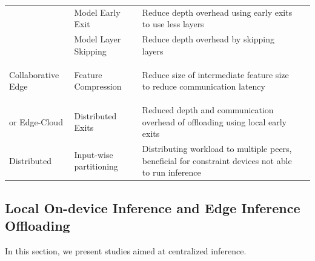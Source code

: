 \begin{minipage}[t]{\linewidth}
\begin{footnotesize}
\begin{longtabu}{>{\bfseries}X[c]|X[l]|X[3l]|X[c]}
			& Model Early Exit & Reduce depth overhead using early exits to use less layers%
			& \cite{leroux_resource-constrained_2015,teerapittayanon_branchynet:_2016, berestizshevsky_sacrificing_2019, kaya_shallow-deep_nodate, huang_multi-scale_2017} \tabularnewline
			& Model Layer Skipping & Reduce depth overhead by skipping layers %
			& \cite{wang_skipnet:_2017,wu_blockdrop:_2017} \tabularnewline\hline
			
			Collaborative Edge  & Feature Compression & Reduce size of intermediate feature size to reduce communication latency%
			& \cite{kang_neurosurgeon:_2017,choi_near-lossless_2018, choi_deep_2018, eshratifar_bottlenet:_2019} \tabularnewline
			
			or Edge-Cloud & Distributed Exits & Reduced depth and communication overhead of offloading using local early exits%
			& \cite{leroux_cascading_2017,teerapittayanon_distributed_2017, li_edge_2018} \tabularnewline\hline
			
			Distributed & Input-wise partitioning & Distributing workload to multiple peers, beneficial for constraint devices not able to run inference%
			& \cite{mao_modnn:_2017, zhao_deepthings:_2018}
			\tabularnewline
			
			\bottomrule
		\end{longtabu}
	\end{footnotesize}
\end{minipage}

\subsection{Local On-device Inference and Edge Inference Offloading}

In this section, we present studies aimed at centralized inference.

